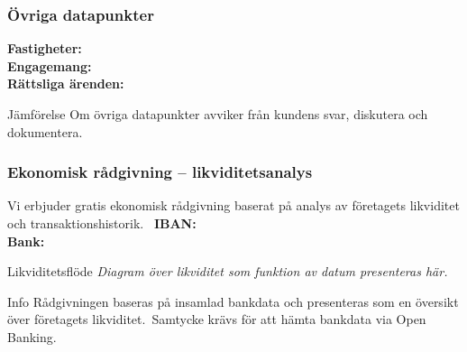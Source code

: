 \documentclass[10pt]{beamer}
\begin{document}
\begin{frame}[label=ovrigt]
  \frametitle{Övriga datapunkter}
  \small
  \textbf{Fastigheter:} \underline{\hspace{8cm}} \\
  \textbf{Engagemang:} \underline{\hspace{8cm}} \\
  \textbf{Rättsliga ärenden:} \underline{\hspace{8cm}} \\
  \vspace{0.5cm}
  \begin{block}{Jämförelse}
    Om övriga datapunkter avviker från kundens svar, diskutera och dokumentera.
  \end{block}
  \vspace{0.8cm}
  \begin{flushright}
    \hyperlink{nextslide}{}
  \end{flushright}
\end{frame}

\begin{frame}[label=ekorad]
  \frametitle{Ekonomisk rådgivning – likviditetsanalys}
  \small
  Vi erbjuder gratis ekonomisk rådgivning baserat på analys av företagets likviditet och transaktionshistorik.\
  \vspace{0.5cm}
  \textbf{IBAN:} \underline{\hspace{7cm}} \\
  \textbf{Bank:} \underline{\hspace{7cm}} \\
  \vspace{0.5cm}
  \begin{block}{Likviditetsflöde}
    \textit{Diagram över likviditet som funktion av datum presenteras här.}
  \end{block}
  \vspace{0.5cm}
  \begin{block}{Info}
    Rådgivningen baseras på insamlad bankdata och presenteras som en översikt över företagets likviditet.\
    Samtycke krävs för att hämta bankdata via Open Banking.
  \end{block}
  \vspace{0.8cm}
  \begin{flushright}
    \hyperlink{nextslide}{}
  \end{flushright}
\end{frame}
\end{document}
